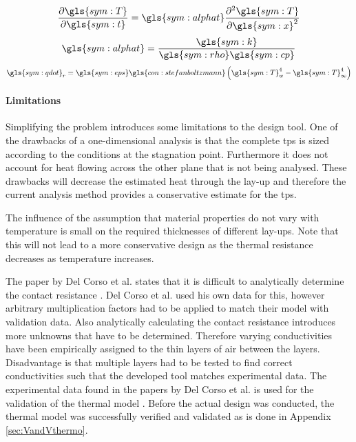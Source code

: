 \begin{multicols}{3}
	\begin{equation}
	\frac{\partial \gls{sym:T}}{\partial \gls{sym:t}} = \gls{sym:alphat}\frac{\partial^2\gls{sym:T}}{\partial \gls{sym:x}^2}
	\label{eq:thermheat}
	\end{equation}\break
	\begin{equation}
	\gls{sym:alphat} = \frac{\gls{sym:k}}{\gls{sym:rho}\gls{sym:cp}}
	\label{eq:thermdif}
	\end{equation}\break
	\begin{equation}
	\gls{sym:qdot}_r = \gls{sym:eps}\gls{con:stefanboltzmann}\left(\gls{sym:T}_w^4-\gls{sym:T}_\infty^4\right)
	\label{eq:thermrad}
	\end{equation}
\end{multicols}

\paragraph{Limitations}
Simplifying the problem introduces some limitations to the design tool. One of the drawbacks of a one-dimensional analysis is that the complete \gls{tps} is sized according to the conditions at the stagnation point. Furthermore it does not account for heat flowing across the other plane that is not being analysed. These drawbacks will decrease the estimated heat through the lay-up and therefore the current analysis method provides a conservative estimate for the \gls{tps}. 

The influence of the assumption that material properties do not vary with temperature is small on the required thicknesses of different lay-ups. Note that this will not lead to a more conservative design as the thermal resistance decreases as temperature increases. 

The paper by Del Corso et al. states that it is difficult to analytically determine the contact resistance \cite{Corso2009}. Del Corso et al. used his own data for this, however arbitrary multiplication factors had to be applied to match their model with validation data. Also analytically calculating the contact resistance introduces more unknowns that have to be determined. Therefore varying conductivities have been empirically assigned to the thin layers of air between the layers. Disadvantage is that multiple layers had to be tested to find correct conductivities such that the developed tool matches experimental data. The experimental data found in the papers by Del Corso et al. is used for the validation of the thermal model \cite{Corso2009,Corso2011}. Before the actual design was conducted, the thermal model was successfully verified and validated as is done in Appendix \ref{sec:VandVthermo}.



